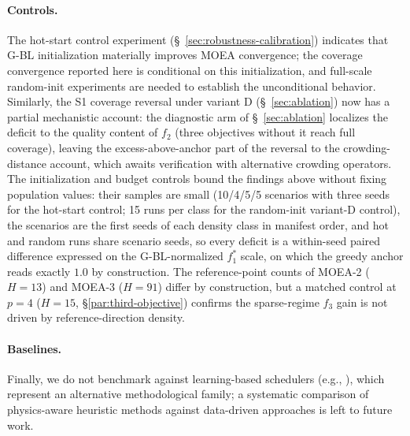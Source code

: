\documentclass[preprint,12pt,authoryear]{elsarticle}
\begin{document}
\paragraph{Controls.}
The hot-start control experiment
(\S~\ref{sec:robustness-calibration}) indicates that G-BL
initialization materially improves MOEA convergence; the coverage
convergence reported here is conditional on this initialization, and
full-scale random-init experiments are needed to establish the unconditional
behavior. Similarly, the S1
coverage reversal under variant D (\S~\ref{sec:ablation}) now has a
partial mechanistic account: the diagnostic arm of \S~\ref{sec:ablation}
localizes the deficit to the quality content of $f_2$ (three objectives
without it reach full coverage), leaving the excess-above-anchor part of
the reversal to the crowding-distance account, which awaits verification
with alternative crowding operators.
The initialization and budget controls bound the findings above without fixing
population values: their samples are small (10/4/5/5 scenarios with three seeds
for the hot-start control; 15 runs per class for the random-init variant-D
control), the scenarios are the first seeds of each density class in manifest
order, and hot and random runs share scenario seeds, so every deficit is a
within-seed paired difference expressed on the G-BL-normalized $f_1^*$ scale,
on which the greedy anchor reads exactly $1.0$ by construction. The reference-point counts of MOEA-2
($H=13$) and MOEA-3 ($H=91$) differ by construction, but a matched control at $p=4$
($H=15$, \S\ref{par:third-objective}) confirms the sparse-regime $f_3$ gain is not driven by
reference-direction density.

\paragraph{Baselines.}
Finally, we do not benchmark against learning-based
schedulers (e.g., \citet{Chen2025NeuralPriority}), which represent an alternative
methodological family; a systematic comparison of physics-aware
heuristic methods against data-driven approaches is left to
future work.

\end{document}
